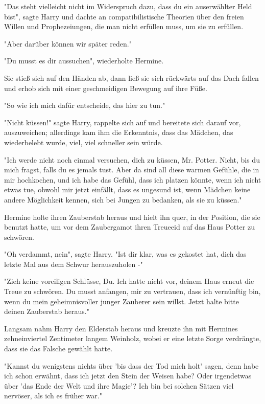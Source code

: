 {"Das steht vielleicht nicht im Widerspruch dazu, dass du ein auserwählter Held bist", sagte Harry und dachte an compatibilistische Theorien über den freien Willen und Prophezeiungen, die man nicht erfüllen muss, um sie zu erfüllen.

"Aber darüber können wir später reden."

"Du musst es dir aussuchen", wiederholte Hermine.

Sie stieß sich auf den Händen ab, dann ließ sie sich rückwärts auf das Dach fallen und erhob sich mit einer geschmeidigen Bewegung auf ihre Füße.

"So wie ich mich dafür entscheide, das hier zu tun."

"Nicht küssen!" sagte Harry, rappelte sich auf und bereitete sich darauf vor, auszuweichen; allerdings kam ihm die Erkenntnis, dass das Mädchen, das wiederbelebt wurde, viel, viel schneller sein würde.

"Ich werde nicht noch einmal versuchen, dich zu küssen, Mr. Potter. Nicht, bis du mich fragst, falls du es jemals tust. Aber da sind all diese warmen Gefühle, die in mir hochkochen, und ich habe das Gefühl, dass ich platzen könnte, wenn ich nicht etwas tue, obwohl mir jetzt einfällt, dass es ungesund ist, wenn Mädchen keine andere Möglichkeit kennen, sich bei Jungen zu bedanken, als sie zu küssen."

Hermine holte ihren Zauberstab heraus und hielt ihn quer, in der Position, die sie benutzt hatte, um vor dem Zaubergamot ihren Treueeid auf das Haus Potter zu schwören.

"Oh verdammt, nein", sagte Harry. "Ist dir klar, was es gekostet hat, dich das letzte Mal aus dem Schwur herauszuholen -"

"Zieh keine voreiligen Schlüsse, Du. Ich hatte nicht vor, deinem Haus erneut die Treue zu schwören. Du musst anfangen, mir zu vertrauen, dass ich vernünftig bin, wenn du mein geheimnisvoller junger Zauberer sein willst. Jetzt halte bitte deinen Zauberstab heraus."

Langsam nahm Harry den Elderstab heraus und kreuzte ihn mit Hermines zehneinviertel Zentimeter langem Weinholz, wobei er eine letzte Sorge verdrängte, dass sie das Falsche gewählt hatte.

"Kannst du wenigstens nichts über 'bis dass der Tod mich holt' sagen, denn habe ich schon erwähnt, dass ich jetzt den Stein der Weisen habe? Oder irgendetwas über 'das Ende der Welt und ihre Magie'? Ich bin bei solchen Sätzen viel nervöser, als ich es früher war."

}
